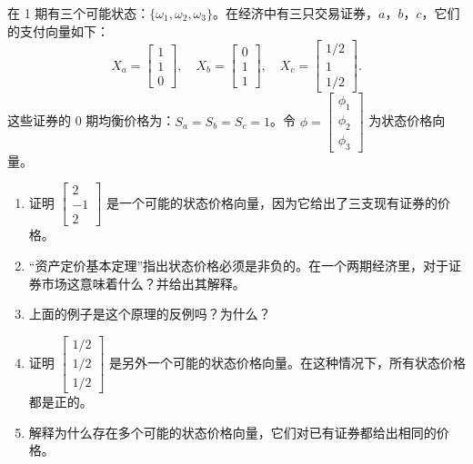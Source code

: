 \begin{problem}
 在 1 期有三个可能状态：$\{\omega_{1},\omega_{2},\omega_{3}\}$。在经济中有三只交易证券，$a$，$b$，$c$，它们的支付向量如下：
\[
    X_{a}=\begin{bmatrix}1\\1\\0\end{bmatrix},\quad
    X_{b}=\begin{bmatrix}0\\1\\1\end{bmatrix},\quad
    X_{c}=\begin{bmatrix}1/2\\1\\1/2\end{bmatrix}.
\]
这些证券的 0 期均衡价格为：$S_{a}=S_{b}=S_{c}=1$。令 $\phi=\begin{bmatrix}\phi_{1} \\ \phi_{2} \\ \phi_{3}\end{bmatrix}$ 为状态价格向量。
\begin{enumerate}[label=(\alph*)]
    \item 证明 $\begin{bmatrix}2 \\ -1 \\ 2\end{bmatrix}$ 是一个可能的状态价格向量，因为它给出了三支现有证券的价格。
    \item “资产定价基本定理”指出状态价格必须是非负的。在一个两期经济里，对于证券市场这意味着什么？并给出其解释。
    \item 上面的例子是这个原理的反例吗？为什么？
    \item 证明 $\begin{bmatrix}1/2 \\ 1/2 \\ 1/2\end{bmatrix}$ 是另外一个可能的状态价格向量。在这种情况下，所有状态价格都是正的。
    \item 解释为什么存在多个可能的状态价格向量，它们对已有证券都给出相同的价格。
\end{enumerate}
\end{problem}
